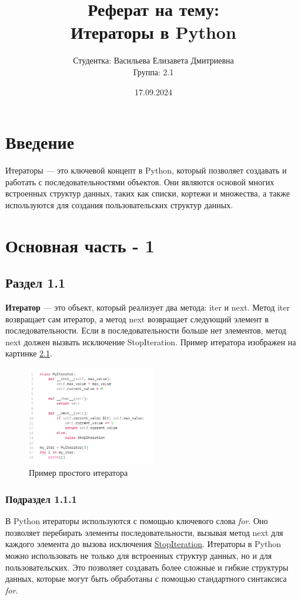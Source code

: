\documentclass[14pt]{extreport}
\begin{document}
\title{Реферат на тему: \\[0.5cm] \textbf{Итераторы в Python}}
\author{Студентка: Васильева Елизавета Дмитриевна \\ Группа: 2.1}
\date{17.09.2024}
\thispagestyle{empty}
\maketitle
\chapter{Введение}  
\sloppy

Итераторы — это ключевой концепт в Python, который позволяет создавать и работать с последовательностями объектов. Они являются основой многих встроенных структур данных, таких как списки, кортежи и множества, а также используются для создания пользовательских структур данных.

\chapter{Основная часть - 1}  
\section{Раздел 1.1}  
\sloppy
\textbf{Итератор} — это объект, который реализует два метода: iter и next. Метод iter возвращает сам итератор, а метод next возвращает следующий элемент в последовательности. Если в последовательности больше нет элементов, метод next должен вызвать исключение StopIteration. Пример итератора изображен на картинке \ref{fig:image1}.

\begin{figure}[ht]
\centering
\includegraphics[width=0.5\textwidth]{image1.png}
\caption{Пример простого итератора}
\label{fig:image1}
\end{figure}




\subsection{Подраздел 1.1.1}  
\sloppy
В Python итераторы используются с помощью ключевого слова \textit{for}. Оно позволяет перебирать элементы последовательности, вызывая метод next для каждого элемента до вызова исключения \underline{StopIteration}. Итераторы в Python можно использовать не только для встроенных структур данных, но и для пользовательских. Это позволяет создавать более сложные и гибкие структуры данных, которые могут быть обработаны с помощью стандартного синтаксиса \textit{for}.
\end{document}
